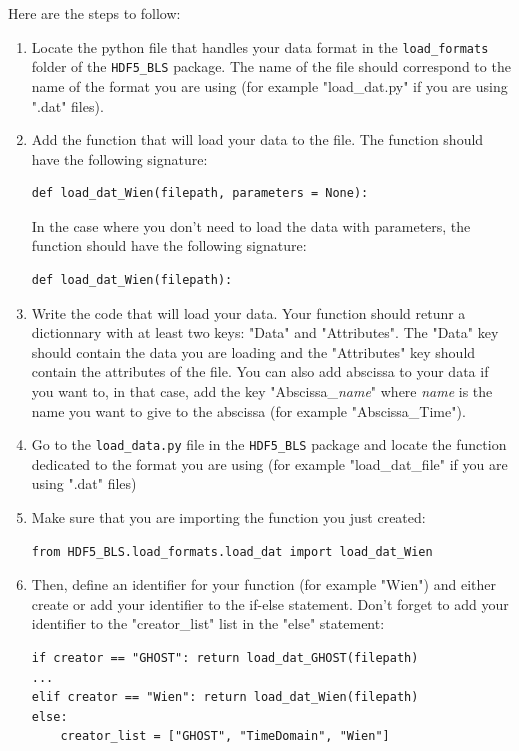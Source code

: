 \documentclass[a4paper,12pt]{article}
\begin{document}
        Here are the steps to follow:
        \begin{enumerate}
            \item Locate the python file that handles your data format in the \texttt{load\_formats} folder of the \texttt{HDF5\_BLS} package. The name of the file should correspond to the name of the format you are using (for example "load\_dat.py" if you are using ".dat" files).
            \item Add the function that will load your data to the file. The function should have the following signature:
\begin{lstlisting}
def load_dat_Wien(filepath, parameters = None):
\end{lstlisting}
            In the case where you don't need to load the data with parameters, the function should have the following signature:
\begin{lstlisting}
def load_dat_Wien(filepath):
\end{lstlisting}
            \item Write the code that will load your data. Your function should retunr a dictionnary with at least two keys: "Data" and "Attributes". The "Data" key should contain the data you are loading and the "Attributes" key should contain the attributes of the file. You can also add abscissa to your data if you want to, in that case, add the key "Abscissa\_\textsl{name}" where \textsl{name} is the name you want to give to the abscissa (for example "Abscissa\_Time").
            \item Go to the \texttt{load\_data.py} file in the \texttt{HDF5\_BLS} package and locate the function dedicated to the format you are using (for example "load\_dat\_file" if you are using ".dat" files)
            \item Make sure that you are importing the function you just created:
\begin{lstlisting}
from HDF5_BLS.load_formats.load_dat import load_dat_Wien
\end{lstlisting}
            \item Then, define an identifier for your function (for example "Wien") and either create or add your identifier to the if-else statement. Don't forget to add your identifier to the "creator\_list" list in the "else" statement:
\begin{lstlisting}
if creator == "GHOST": return load_dat_GHOST(filepath)
...
elif creator == "Wien": return load_dat_Wien(filepath)
else:
    creator_list = ["GHOST", "TimeDomain", "Wien"]

\end{lstlisting}
\end{enumerate}
\end{document}

